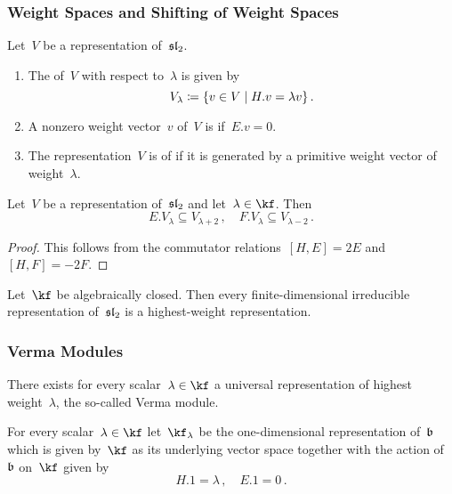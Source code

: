 \documentclass[a4paper, 11pt, oneside]{scrartcl}
\begin{document}
\subsubsection{Weight Spaces and Shifting of Weight Spaces}

\begin{definition}
  Let~$V$ be a representation of~$\mathfrak{sl}_2$.
  \begin{enumerate}
    \item
      The  of~$V$ with respect to~$\lambda$ is given by
      \[
        V_\lambda
        \defined
        \{ v \in V \suchthat H.v = \lambda v \} \,.
      \]
    \item
      A nonzero weight vector~$v$ of~$V$ is  if~$E.v = 0$.
    \item
      The representation~$V$ is of  if it is generated by a primitive weight vector of weight~$\lambda$.
  \end{enumerate}
\end{definition}

\begin{proposition}
  \label{shifting lemma}
  Let~$V$ be a representation of~$\mathfrak{sl}_2$ and let~$\lambda \in \kf$.
  Then
  \[
    E.V_\lambda
    \subseteq
    V_{\lambda + 2} \,,
    \quad
    F.V_\lambda
    \subseteq
    V_{\lambda - 2} \,.
  \]
\end{proposition}

\begin{proof}
  This follows from the commutator relations~$[H,E] = 2E$ and~$[H,F] = -2F$.
\end{proof}

\begin{lemma}
  Let~$\kf$ be algebraically closed.
  Then every finite-dimensional irreducible representation of~$\mathfrak{sl}_2$ is a highest-weight representation.
\end{lemma}

\subsubsection{Verma Modules}

There exists for every scalar~$\lambda \in \kf$ a universal representation of highest weight~$\lambda$, the so-called Verma module. 

\begin{definition}
  For every scalar~$\lambda \in \kf$ let~$\kf_\lambda$ be the one-dimensional representation of~$\mathfrak{b}$ which is given by~$\kf$ as its underlying vector space together with the action of~$\mathfrak{b}$ on~$\kf$ given by
  \[
    H.1 = \lambda \,,
    \quad
    E.1 = 0 \,.
  \]
\end{definition}
\end{document}
